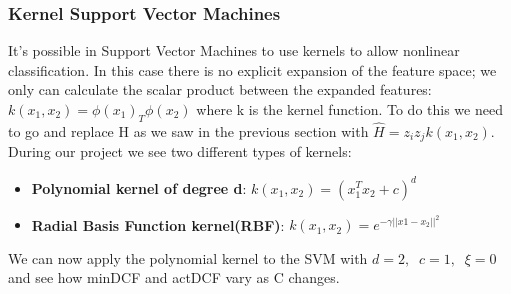 \newpage

\subsubsection{Kernel Support Vector Machines}
It's possible in Support Vector Machines to use kernels to allow nonlinear classification.
In this case there is no explicit expansion of the feature space;
we only can calculate the scalar product between the expanded features:\( k(x_1,x_2)=\phi(x_1)_T\phi(x_2)\) where k is the kernel function.
To do this we need to go and replace H as we saw in the previous section with \(\hat{H}= z_iz_jk(x_1,x_2)\).
During our project we see two different types of kernels:
\begin{itemize}
    \item \textbf{Polynomial kernel of degree d}: \(k(x_1,x_2)=(x_1^Tx_2+c)^d\)
    \item \textbf{Radial Basis Function kernel(RBF)}: \(k(x_1,x_2)=e^{-\gamma||x1-x_2||^2}\)
\end{itemize}
We can now apply the polynomial kernel to the SVM with \(d=2,\;\; c=1, \;\;\xi=0\) and see how minDCF and actDCF vary as C changes.


